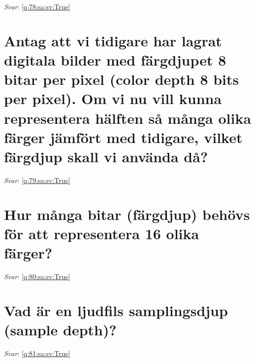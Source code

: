 \documentclass[a4paper,11pt,oneside]{book}
\begin{document}
\begin{sloppypar}
\vspace{1cm}

\textit{Svar}: \autoref{q:78:sa:sv:True}



\section{Antag att vi tidigare har lagrat digitala bilder med f\"argdjupet 8 bitar per pixel (color depth 8 bits per pixel). Om vi nu vill kunna representera h\"alften s\r{a} m\r{a}nga olika f\"arger j\"amf\"ort med tidigare, vilket f\"argdjup skall vi anv\"anda d\r{a}?}

\label{q:79:sa:sv:False}

\vspace{2cm}

\noindent\makebox[\textwidth]{\hrulefill}

\vspace{1cm}

\textit{Svar}: \autoref{q:79:sa:sv:True}



\section{Hur m\r{a}nga bitar (f\"argdjup) beh\"ovs f\"or att representera 16 olika f\"arger?}

\label{q:80:sa:sv:False}

\vspace{2cm}

\noindent\makebox[\textwidth]{\hrulefill}

\vspace{1cm}

\textit{Svar}: \autoref{q:80:sa:sv:True}



\section{Vad \"ar en ljudfils samplingsdjup (sample depth)?}

\label{q:81:sa:sv:False}

\vspace{2cm}

\noindent\makebox[\textwidth]{\hrulefill}

\vspace{1cm}

\textit{Svar}: \autoref{q:81:sa:sv:True}




\end{sloppypar}
\end{document}
